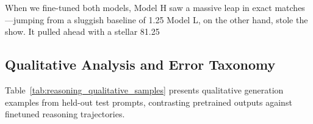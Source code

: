 \documentclass[8pt]{article}
\begin{document}
When we fine-tuned both models, Model H saw a massive leap in exact matches—jumping from a sluggish baseline of 1.25%
Model L, on the other hand, stole the show. It pulled ahead with a stellar 81.25%


\subsection{Qualitative Analysis and Error Taxonomy}
\label{subsec:reasoning_qualitative}

Table~\ref{tab:reasoning_qualitative_samples} presents qualitative generation examples from held-out test prompts, contrasting pretrained outputs against finetuned reasoning trajectories.
\end{document}
